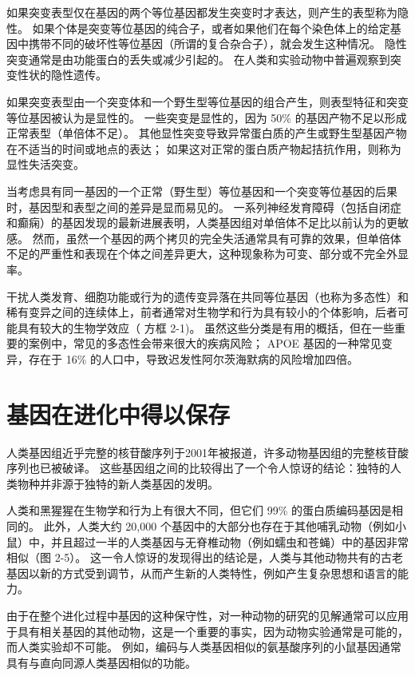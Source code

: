 如果突变表型仅在基因的两个等位基因都发生突变时才表达，则产生的表型称为隐性。 
如果个体是突变等位基因的纯合子，或者如果他们在每个染色体上的给定基因中携带不同的破坏性等位基因（所谓的复合杂合子），就会发生这种情况。 
隐性突变通常是由功能蛋白的丢失或减少引起的。 
在人类和实验动物中普遍观察到突变性状的隐性遗传。


如果突变表型由一个突变体和一个野生型等位基因的组合产生，则表型特征和突变等位基因被认为是显性的。 
一些突变是显性的，因为 50\% 的基因产物不足以形成正常表型（单倍体不足）。 
其他显性突变导致异常蛋白质的产生或野生型基因产物在不适当的时间或地点的表达； 
如果这对正常的蛋白质产物起拮抗作用，则称为显性失活突变。


当考虑具有同一基因的一个正常（野生型）等位基因和一个突变等位基因的后果时，基因型和表型之间的差异是显而易见的。 
一系列神经发育障碍（包括自闭症和癫痫）的基因发现的最新进展表明，人类基因组对单倍体不足比以前认为的更敏感。 
然而，虽然一个基因的两个拷贝的完全失活通常具有可靠的效果，但单倍体不足的严重性和表现在个体之间差异更大，这种现象称为可变、部分或不完全外显率。


干扰人类发育、细胞功能或行为的遗传变异落在共同等位基因（也称为多态性）和稀有变异之间的连续体上，前者通常对生物学和行为具有较小的个体影响，后者可能具有较大的生物学效应（ 方框 2-1)。 
虽然这些分类是有用的概括，但在一些重要的案例中，常见的多态性会带来很大的疾病风险； 
APOE 基因的一种常见变异，存在于 16\% 的人口中，导致迟发性阿尔茨海默病的风险增加四倍。


\section{基因在进化中得以保存}

人类基因组近乎完整的核苷酸序列于2001年被报道，许多动物基因组的完整核苷酸序列也已被破译。 
这些基因组之间的比较得出了一个令人惊讶的结论：独特的人类物种并非源于独特的新人类基因的发明。


人类和黑猩猩在生物学和行为上有很大不同，但它们 99\% 的蛋白质编码基因是相同的。 
此外，人类大约 20,000 个基因中的大部分也存在于其他哺乳动物（例如小鼠）中，并且超过一半的人类基因与无脊椎动物（例如蠕虫和苍蝇）中的基因非常相似（图 2-5）。 
这一令人惊讶的发现得出的结论是，人类与其他动物共有的古老基因以新的方式受到调节，从而产生新的人类特性，例如产生复杂思想和语言的能力。


由于在整个进化过程中基因的这种保守性，对一种动物的研究的见解通常可以应用于具有相关基因的其他动物，这是一个重要的事实，因为动物实验通常是可能的，而人类实验却不可能。 
例如，编码与人类基因相似的氨基酸序列的小鼠基因通常具有与直向同源人类基因相似的功能。


